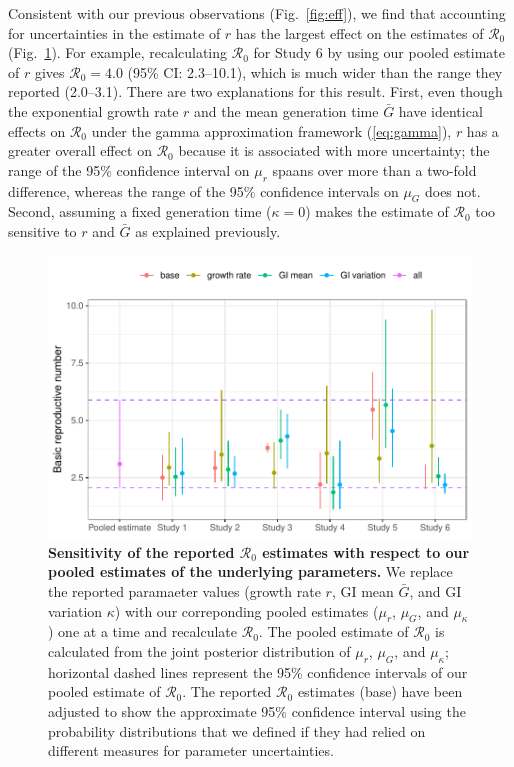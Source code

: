 \documentclass[12pt]{article}
\newcommand{\eref}[1]{(\ref{eq:#1})}
\newcommand{\fref}[1]{Fig.~\ref{fig:#1}}
\begin{document}
Consistent with our previous observations (\fref{eff}),
we find that accounting for uncertainties in the estimate of $r$ has the largest effect on the estimates of $\mathcal R_0$ (\fref{R0}).
For example, recalculating $\mathcal R_0$ for Study 6 by using our pooled estimate of $r$ gives $\mathcal R_0 = 4.0$ (95\% CI: 2.3--10.1), which is much wider than the range they reported (2.0--3.1).
There are two explanations for this result.
First, even though the exponential growth rate $r$ and the mean generation time $\bar G$ have identical effects on $\mathcal R_0$ under the gamma approximation framework \eref{gamma},
$r$ has a greater overall effect on $\mathcal R_0$ because it is associated with more uncertainty;
the range of the 95\% confidence interval on $\mu_r$ spaans over more than a two-fold difference, whereas the range of the 95\% confidence intervals on $\mu_G$ does not.
Second, assuming a fixed generation time ($\kappa=0$) makes the estimate of $\mathcal R_0$ too sensitive to $r$ and $\bar G$ as explained previously.

\begin{figure}[t]
\includegraphics[width=\textwidth]{compare_R0.pdf}
\caption{
\textbf{Sensitivity of the reported $\mathcal R_0$ estimates with respect to our pooled estimates of the underlying parameters.}
We replace the reported paramaeter values (growth rate $r$, GI mean $\bar G$, and GI variation $\kappa$) with our correponding pooled estimates ($\mu_r$, $\mu_G$, and $\mu_\kappa$) one at a time and recalculate $\mathcal R_0$.
The pooled estimate of $\mathcal R_0$ is calculated from the joint posterior distribution of $\mu_r$, $\mu_G$, and $\mu_\kappa$;
horizontal dashed lines represent the 95\% confidence intervals of our pooled estimate of $\mathcal R_0$.
The reported $\mathcal R_0$ estimates (base) have been adjusted to show the approximate 95\% confidence interval using the probability distributions that we defined if they had relied on different measures for parameter uncertainties.
}
\label{fig:R0}
\end{figure}
\end{document}
